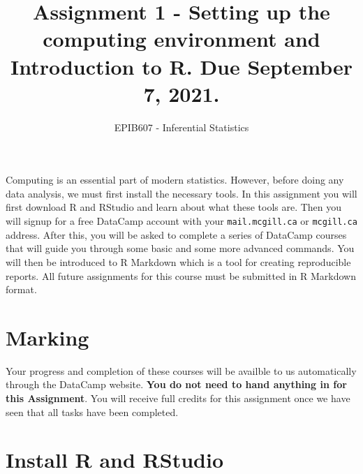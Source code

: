 \documentclass[letterpaper,12pt,twoside,]{pinp}
\title{Assignment 1 - Setting up the computing environment and
Introduction to R. Due September 7, 2021.}
\author[a]{EPIB607 - Inferential Statistics}
\affil[a]{Fall 2021, McGill University}
\begin{document}
\verticaladjustment{-2pt}

\maketitle
\thispagestyle{firststyle}



\tableofcontents

\vspace*{1in}

Computing is an essential part of modern statistics. However, before
doing any data analysis, we must first install the necessary tools. In
this assignment you will first download R and RStudio and learn about
what these tools are. Then you will signup for a free DataCamp account
with your \texttt{mail.mcgill.ca} or \texttt{mcgill.ca} address. After
this, you will be asked to complete a series of DataCamp courses that
will guide you through some basic and some more advanced commands. You
will then be introduced to R Markdown which is a tool for creating
reproducible reports. All future assignments for this course must be
submitted in R Markdown format.

\newpage

\hypertarget{marking}{%
\section{Marking}\label{marking}}

Your progress and completion of these courses will be availble to us
automatically through the DataCamp website. \textbf{You do not need to
hand anything in for this Assignment}. You will receive full credits for
this assignment once we have seen that all tasks have been completed.

\hypertarget{install-r-and-rstudio}{%
\section{Install R and RStudio}\label{install-r-and-rstudio}}
\end{document}

